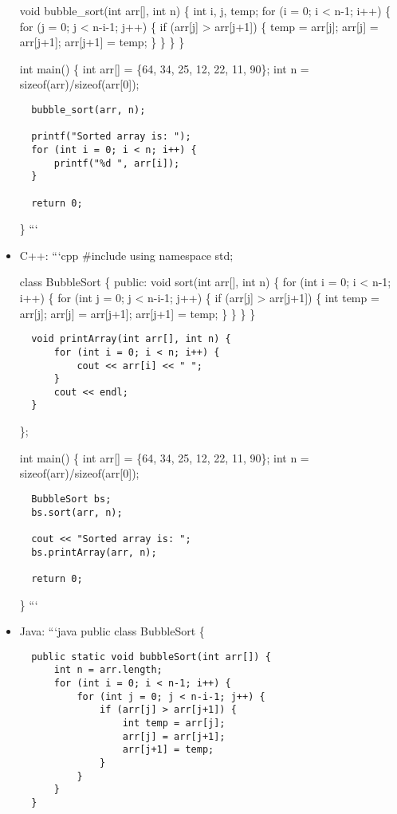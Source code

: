 \documentclass[
  letterpaper,
  DIV=11,
  numbers=noendperiod]{scrreprt}
\begin{document}
\begin{itemize}
  void bubble\_sort(int arr{[}{]}, int n) \{ int i, j, temp; for (i = 0;
  i \textless{} n-1; i++) \{ for (j = 0; j \textless{} n-i-1; j++) \{ if
  (arr{[}j{]} \textgreater{} arr{[}j+1{]}) \{ temp = arr{[}j{]};
  arr{[}j{]} = arr{[}j+1{]}; arr{[}j+1{]} = temp; \} \} \} \}

  int main() \{ int arr{[}{]} = \{64, 34, 25, 12, 22, 11, 90\}; int n =
  sizeof(arr)/sizeof(arr{[}0{]});

\begin{verbatim}
  bubble_sort(arr, n);

  printf("Sorted array is: ");
  for (int i = 0; i < n; i++) {
      printf("%d ", arr[i]);
  }

  return 0;
\end{verbatim}

  \} ```
\item
  C++: ```cpp \#include using namespace std;

  class BubbleSort \{ public: void sort(int arr{[}{]}, int n) \{ for
  (int i = 0; i \textless{} n-1; i++) \{ for (int j = 0; j \textless{}
  n-i-1; j++) \{ if (arr{[}j{]} \textgreater{} arr{[}j+1{]}) \{ int temp
  = arr{[}j{]}; arr{[}j{]} = arr{[}j+1{]}; arr{[}j+1{]} = temp; \} \} \}
  \}

\begin{verbatim}
  void printArray(int arr[], int n) {
      for (int i = 0; i < n; i++) {
          cout << arr[i] << " ";
      }
      cout << endl;
  }
\end{verbatim}

  \};

  int main() \{ int arr{[}{]} = \{64, 34, 25, 12, 22, 11, 90\}; int n =
  sizeof(arr)/sizeof(arr{[}0{]});

\begin{verbatim}
  BubbleSort bs;
  bs.sort(arr, n);

  cout << "Sorted array is: ";
  bs.printArray(arr, n);

  return 0;
\end{verbatim}

  \} ```
\item
  Java: ```java public class BubbleSort \{

\begin{verbatim}
  public static void bubbleSort(int arr[]) {
      int n = arr.length;
      for (int i = 0; i < n-1; i++) {
          for (int j = 0; j < n-i-1; j++) {
              if (arr[j] > arr[j+1]) {
                  int temp = arr[j];
                  arr[j] = arr[j+1];
                  arr[j+1] = temp;
              }
          }
      }
  }


\end{verbatim}
\end{itemize}
\end{document}
